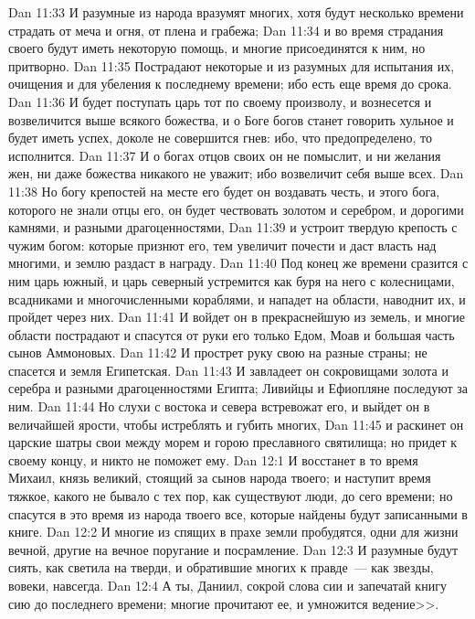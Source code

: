 \vs Dan 11:33 И разумные из народа вразумят многих, хотя будут несколько времени страдать от меча и огня, от плена и грабежа;
\vs Dan 11:34 и во время страдания своего будут иметь некоторую помощь, и многие присоединятся к ним, но притворно.
\vs Dan 11:35 Пострадают некоторые и из разумных для испытания их, очищения и для убеления к последнему времени; ибо есть еще время до срока.
\vs Dan 11:36 И будет поступать царь тот по своему произволу, и вознесется и возвеличится выше всякого божества, и о Боге богов станет говорить хульное и будет иметь успех, доколе не совершится гнев: ибо, что предопределено, то исполнится.
\vs Dan 11:37 И о богах отцов своих он не помыслит, и ни желания жен, ни даже божества никакого не уважит; ибо возвеличит себя выше всех.
\vs Dan 11:38 Но богу крепостей на месте его будет он воздавать честь, и этого бога, которого не знали отцы его, он будет чествовать золотом и серебром, и дорогими камнями, и разными драгоценностями,
\vs Dan 11:39 и устроит твердую крепость с чужим богом: которые признют его, тем увеличит почести и даст власть над многими, и землю раздаст в награду.
\vs Dan 11:40 Под конец же времени сразится с ним царь южный, и царь северный устремится как буря на него с колесницами, всадниками и многочисленными кораблями, и нападет на области, наводнит их, и пройдет через них.
\vs Dan 11:41 И войдет он в прекраснейшую из земель, и многие области пострадают и спасутся от руки его только Едом, Моав и большая часть сынов Аммоновых.
\vs Dan 11:42 И прострет руку свою на разные страны; не спасется и земля Египетская.
\vs Dan 11:43 И завладеет он сокровищами золота и серебра и разными драгоценностями Египта; Ливийцы и Ефиопляне последуют за ним.
\vs Dan 11:44 Но слухи с востока и севера встревожат его, и выйдет он в величайшей ярости, чтобы истреблять и губить многих,
\vs Dan 11:45 и раскинет он царские шатры свои между морем и горою преславного святилища; но придет к своему концу, и никто не поможет ему.
\vs Dan 12:1 И восстанет в то время Михаил, князь великий, стоящий за сынов народа твоего; и наступит время тяжкое, какого не бывало с тех пор, как существуют люди, до сего времени; но спасутся в это время из народа твоего все, которые найдены будут записанными в книге.
\vs Dan 12:2 И многие из спящих в прахе земли пробудятся, одни для жизни вечной, другие на вечное поругание и посрамление.
\vs Dan 12:3 И разумные будут сиять, как светила на тверди, и обратившие многих к правде~--- как звезды, вовеки, навсегда.
\vs Dan 12:4 А ты, Даниил, сокрой слова сии и запечатай книгу сию до последнего времени; многие прочитают ее, и умножится ведение>>.
